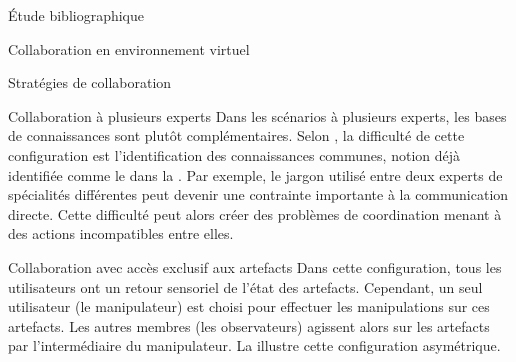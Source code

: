 \documentclass[myfrancais,ngerman,english,french]{mythesis}
\begin{document}
\begin{mychapter}{Étude bibliographique}
\begin{mysection}{Collaboration en environnement virtuel}
\begin{mysubsection}{Stratégies de collaboration}
\begin{mysubsubsection}{Collaboration à plusieurs experts}
					Dans les scénarios à plusieurs experts, les bases de connaissances sont plutôt complémentaires.
					Selon , la difficulté de cette configuration est l'identification des connaissances communes, notion déjà identifiée comme le \mygrounding dans la .
					Par exemple, le jargon utilisé entre deux experts de spécialités différentes peut devenir une contrainte importante à la communication directe.
					Cette difficulté peut alors créer des problèmes de coordination menant à des actions incompatibles entre elles.
				\end{mysubsubsection}
				\begin{mysubsubsection}{Collaboration avec accès exclusif aux artefacts}
					Dans cette configuration, tous les utilisateurs ont un retour sensoriel de l'état des artefacts.
					Cependant, un seul utilisateur (le manipulateur) est choisi pour effectuer les manipulations sur ces artefacts.
					Les autres membres (les observateurs) agissent alors sur les artefacts par l'intermédiaire du manipulateur.
					La  illustre cette configuration asymétrique.


\end{mysubsubsection}
\end{mysubsection}
\end{mysection}
\end{mychapter}
\end{document}
